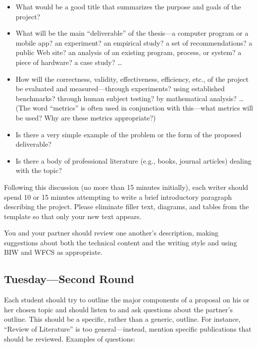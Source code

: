 \begin{itemize}
\item
What would be a good title that summarizes the purpose and goals of the project?
\item
What will be the main ``deliverable'' of the thesis---a computer program or
a mobile app? an
experiment? an empirical study? a set of recommendations? a
public Web site? an analysis of an existing program, process, or system?
a piece of hardware? a case study? \ldots
\item
How will the correctness, validity, effectiveness, efficiency, etc., of the
project be
evaluated and measured---through experiments? using established benchmarks?
through human subject testing? by mathematical analysis? \ldots (The word
``metrics'' is often used in conjunction with this---what
metrics will be used? Why are these metrics appropriate?)
\item
Is there a very simple example of the problem or the form
of the proposed deliverable?
\item
Is there a body of professional literature (e.g., books, journal articles)
dealing with the topic?
\end{itemize}

Following this discussion (no more than 15 minutes initially), each writer
should spend 10 or 15 minutes attempting to write a brief introductory
paragraph describing the project.
Please eliminate filler text, diagrams, and tables from the
template so that only your new text appears.

 You and your partner should review one another's description, making suggestions about both the
technical content and the writing style and using BIW and WFCS as appropriate.

\subsection*{Tuesday---Second Round}

 Each student should try to outline the major
components of a proposal on his or her chosen topic and should listen to
and ask questions about the partner's outline. This should be a
specific, rather than a generic, outline. For instance, ``Review of
Literature'' is too general---instead, mention specific publications
that should be reviewed. Examples of questions:

